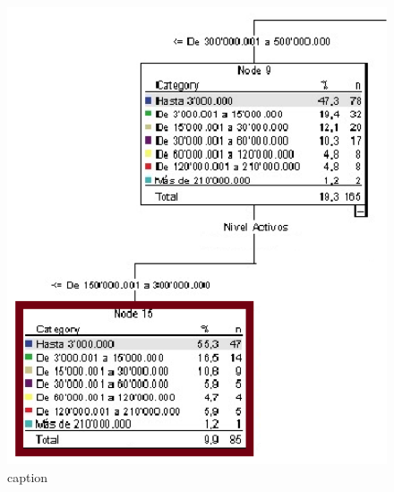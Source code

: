 \begin{itemize}
\begin{figure}[ht!]
  \includegraphics[scale=0.5]{Segmento5}
  \caption{caption}


\end{figure}
\end{itemize}

